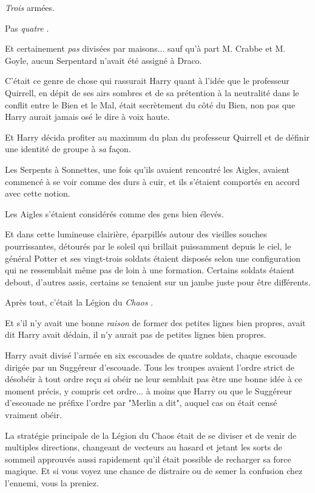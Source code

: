 \emph{Trois}  armées.

Pas \emph{quatre} .

Et certainement \emph{pas}  divisées par maisons... sauf qu'à part M. Crabbe et M. Goyle, aucun Serpentard n'avait été assigné à Draco.

C'était ce genre de chose qui rassurait Harry quant à l'idée que le professeur Quirrell, en dépit de ses airs sombres et de sa prétention à la neutralité dans le conflit entre le Bien et le Mal, était secrètement du côté du Bien, non pas que Harry aurait jamais osé le dire à voix haute.

Et Harry décida profiter au maximum du plan du professeur Quirrell et de définir une identité de groupe à \emph{sa}  façon.

Les Serpents à Sonnettes, une fois qu'ils avaient rencontré les Aigles, avaient commencé à se voir comme des durs à cuir, et ils s'étaient comportés en accord avec cette notion.

Les Aigles s'étaient considérés comme des gens bien élevés.

Et dans cette lumineuse clairière, éparpillés autour des vieilles souches pourrissantes, détourés par le soleil qui brillait puissamment depuis le ciel, le général Potter et ses vingt-trois soldats étaient disposés selon une configuration qui ne ressemblait même pas de loin à une formation. Certains soldats étaient debout, d'autres assis, certains se tenaient sur un jambe juste pour être différents.

Après tout, c'était la Légion du \emph{Chaos} .

Et s'il n'y avait une bonne \emph{raison}  de former des petites lignes bien propres, avait dit Harry avait dédain, il n'y aurait pas de petites lignes bien propres.

Harry avait divisé l'armée en six escouades de quatre soldats, chaque escouade dirigée par un Suggéreur d'escouade. Tous les troupes avaient l'ordre strict de désobéir à tout ordre reçu si obéir ne leur semblait pas être une bonne idée à ce moment précis, y compris cet ordre... à moins que Harry ou que le Suggéreur d'escouade ne préfixe l'ordre par "Merlin a dit", auquel cas on était censé vraiment obéir.

La stratégie principale de la Légion du Chaos était de se diviser et de venir de multiples directions, changeant de vecteurs au hasard et jetant les sorts de sommeil approuvés aussi rapidement qu'il était possible de recharger sa force magique. Et si vous voyez une chance de distraire ou de semer la confusion chez l'ennemi, vous la preniez.

